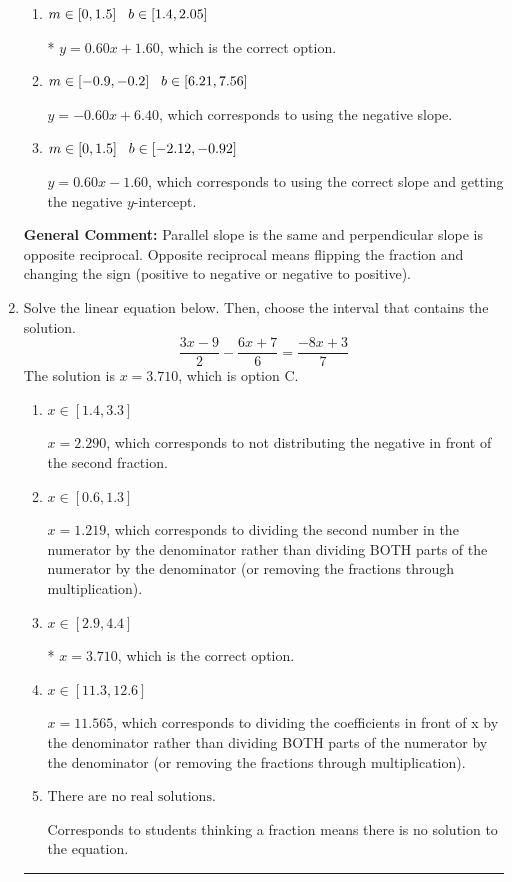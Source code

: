 \documentclass{extbook}[14pt]
\newcommand{\litem}[1]{\item #1

\rule{\textwidth}{0.4pt}}
\begin{document}
\begin{enumerate}
{\begin{enumerate}[label=\Alph*.]
 $y = 1.67x + 1.60$, which corresponds to using the reciprocal slope $(1/m)$.
\item \( m \in [0, 1.5] \hspace*{3mm} b \in [1.4, 2.05] \)

* $y = 0.60x + 1.60$, which is the correct option.
\item \( m \in [-0.9, -0.2] \hspace*{3mm} b \in [6.21, 7.56] \)

 $y = -0.60x + 6.40$, which corresponds to using the negative slope.
\item \( m \in [0, 1.5] \hspace*{3mm} b \in [-2.12, -0.92] \)

 $y = 0.60x - 1.60$, which corresponds to using the correct slope and getting the negative $y$-intercept.
\end{enumerate}

\textbf{General Comment:} Parallel slope is the same and perpendicular slope is opposite reciprocal. Opposite reciprocal means flipping the fraction and changing the sign (positive to negative or negative to positive).
}
\litem{
Solve the linear equation below. Then, choose the interval that contains the solution.
\[ \frac{3x -9}{2} - \frac{6x + 7}{6} = \frac{-8x + 3}{7} \]The solution is \( x = 3.710 \), which is option C.\begin{enumerate}[label=\Alph*.]
\item \( x \in [1.4, 3.3] \)

 $x = 2.290$, which corresponds to not distributing the negative in front of the second fraction.
\item \( x \in [0.6, 1.3] \)

 $x = 1.219$, which corresponds to dividing the second number in the numerator by the denominator rather than dividing BOTH parts of the numerator by the denominator (or removing the fractions through multiplication).
\item \( x \in [2.9, 4.4] \)

* $x = 3.710$, which is the correct option.
\item \( x \in [11.3, 12.6] \)

 $x = 11.565$, which corresponds to dividing the coefficients in front of x by the denominator rather than dividing BOTH parts of the numerator by the denominator (or removing the fractions through multiplication).
\item \( \text{There are no real solutions.} \)

Corresponds to students thinking a fraction means there is no solution to the equation.
\end{enumerate}

}
\end{enumerate}
\end{document}
